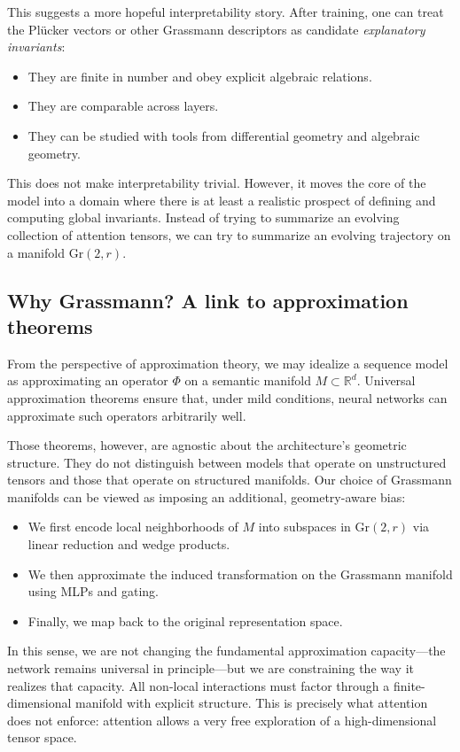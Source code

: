 \documentclass[11pt]{article}
\newcommand{\Gr}{\mathrm{Gr}}
\begin{document}
This suggests a more hopeful interpretability story. After training, one can treat the Pl\"ucker vectors or other Grassmann descriptors as candidate \emph{explanatory invariants}:

\begin{itemize}
    \item They are finite in number and obey explicit algebraic relations.
    \item They are comparable across layers.
    \item They can be studied with tools from differential geometry and algebraic geometry.
\end{itemize}

This does not make interpretability trivial. However, it moves the core of the model into a domain where there is at least a realistic prospect of defining and computing global invariants. Instead of trying to summarize an evolving collection of attention tensors, we can try to summarize an evolving trajectory on a manifold $\Gr(2,r)$.

\subsection{Why Grassmann? A link to approximation theorems}

From the perspective of approximation theory, we may idealize a sequence model as approximating an operator $\Phi$ on a semantic manifold $M \subset \mathbb{R}^d$. Universal approximation theorems ensure that, under mild conditions, neural networks can approximate such operators arbitrarily well.

Those theorems, however, are agnostic about the architecture's geometric structure. They do not distinguish between models that operate on unstructured tensors and those that operate on structured manifolds. Our choice of Grassmann manifolds can be viewed as imposing an additional, geometry-aware bias:

\begin{itemize}
    \item We first encode local neighborhoods of $M$ into subspaces in $\Gr(2,r)$ via linear reduction and wedge products.
    \item We then approximate the induced transformation on the Grassmann manifold using MLPs and gating.
    \item Finally, we map back to the original representation space.
\end{itemize}

In this sense, we are not changing the fundamental approximation capacity---the network remains universal in principle---but we are constraining the way it realizes that capacity. All non-local interactions must factor through a finite-dimensional manifold with explicit structure. This is precisely what attention does not enforce: attention allows a very free exploration of a high-dimensional tensor space.
\end{document}
